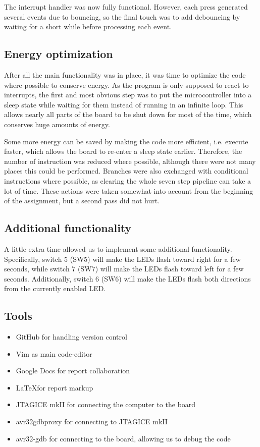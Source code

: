The interrupt handler was now fully functional. However, each press generated several events due to bouncing, so the final touch was to add debouncing by waiting for a short while before processing each event.
\subsection{Energy optimization}

After all the main functionality was in place, it was time to optimize the code where possible to conserve energy. As the program is only supposed to react to interrupts, the first and most obvious step was to put the microcontroller into a sleep state while waiting for them instead of running in an infinite loop. This allows nearly all parts of the board to be shut down for most of the time, which conserves huge amounts of energy.

Some more energy can be saved by making the code more efficient, i.e. execute faster, which allows the board to re-enter a sleep state earlier. Therefore, the number of instruction was reduced where possible, although there were not many places this could be performed. Branches were also exchanged with conditional instructions where possible, as clearing the whole seven step pipeline can take a lot of time. These actions were taken somewhat into account from the beginning of the assignment, but a second pass did not hurt.
\subsection{Additional functionality}

A little extra time allowed us to implement some additional functionality. Specifically, switch 5 (SW5) will make the LEDs flash toward right for a few seconds, while switch 7 (SW7) will make the LEDs flash toward left for a few seconds. Additionally, switch 6 (SW6) will make the LEDs flash both directions from the currently enabled LED.



\subsection{Tools}


\begin{itemize}
\item GitHub for handling version control
\item Vim as main code-editor
\item Google Docs for report collaboration
\item \LaTeX for report markup
\item JTAGICE mkII for connecting the computer to the board
\item avr32gdbproxy for connecting to JTAGICE mkII
\item avr32-gdb for connecting to the board, allowing us to debug the code
\end{itemize}
